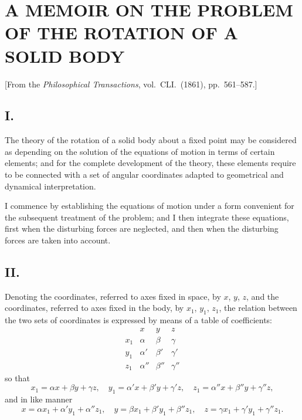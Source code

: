\documentclass[11pt,a4paper]{article}
\begin{document}
\thispagestyle{empty}

\section{A MEMOIR ON THE PROBLEM OF THE ROTATION OF A SOLID BODY}

\begin{center}
[From the \textit{Philosophical Transactions}, vol.\ CLI.\ (1861), pp.~561--587.]
\end{center}

\subsection*{I.}

The theory of the rotation of a solid body about a fixed point may be considered as depending on the solution of the equations of motion in terms of certain elements; and for the complete development of the theory, these elements require to be connected with a set of angular coordinates adapted to geometrical and dynamical interpretation.

I commence by establishing the equations of motion under a form convenient for the subsequent treatment of the problem; and I then integrate these equations, first when the disturbing forces are neglected, and then when the disturbing forces are taken into account.

\subsection*{II.}

Denoting the coordinates, referred to axes fixed in space, by $x$, $y$, $z$, and the coordinates, referred to axes fixed in the body, by $x_1$, $y_1$, $z_1$, the relation between the two sets of coordinates is expressed by means of a table of coefficients:
\[
\begin{array}{c|ccc}
 & x & y & z \\
\hline
x_1 & \alpha & \beta & \gamma \\
y_1 & \alpha' & \beta' & \gamma' \\
z_1 & \alpha'' & \beta'' & \gamma''
\end{array}
\]
so that
\[
x_1 = \alpha x + \beta y + \gamma z, \quad
y_1 = \alpha' x + \beta' y + \gamma' z, \quad
z_1 = \alpha'' x + \beta'' y + \gamma'' z,
\]
and in like manner
\[
x = \alpha x_1 + \alpha' y_1 + \alpha'' z_1, \quad
y = \beta x_1 + \beta' y_1 + \beta'' z_1, \quad
z = \gamma x_1 + \gamma' y_1 + \gamma'' z_1.
\]
\end{document}

